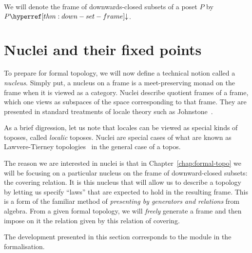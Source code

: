 We will denote the frame of downwards-closed subsets of a poset $P$ by $\dcframe{P}$.

\section{Nuclei and their fixed points}\label{sec:nuclei}

To prepare for formal topology, we will now define a technical notion called a
\emph{nucleus}. Simply put, a nucleus on a frame is a meet-preserving monad on the frame
when it is viewed as a category. Nuclei describe quotient frames of a frame, which one
views as subspaces of the space corresponding to that frame. They are presented in
standard treatments of locale theory such as Johnstone~\cite[Sec.~II.2]{stone-spaces}.

As a brief digression, let us note that locales can be viewed as special kinds of toposes,
called \emph{localic} toposes. Nuclei are special cases of what are known as
Lawvere-Tierney topologies~\cite{quantifiers-and-sheaves, nlab-nucleus} in the general
case of a topos.

The reason we are interested in nuclei is that in Chapter~\ref{chap:formal-topo} we will
be focusing on a particular nucleus on the frame of downward-closed subsets: the covering
relation. It is this nucleus that will allow us to describe a topology by letting us
specify ``laws'' that are expected to hold in the resulting frame. This is a form of the
familiar method of \emph{presenting by generators and relations} from algebra. From a
given formal topology, we will \emph{freely} generate a frame and then impose on it the
relation given by this relation of covering.

The development presented in this section corresponds to the  module
in the \veragda{} formalisation.

